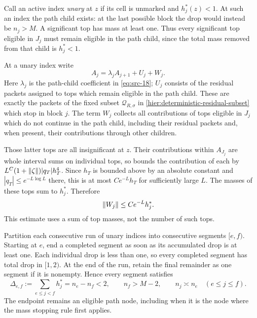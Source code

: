 Call an active index \emph{unary} at $z$ if its cell is unmarked and
$h_j^*(z)<1$.  At such an index the path child exists: at the last
possible block the drop would instead be $n_j>M$.  A significant top
has mass at least one.  Thus every significant top eligible in $J_j$
must remain eligible in the path child, since the total mass removed
from that child is $h_j^*<1$.

At a unary index write
\begin{equation}
  A_j=\lambda_j A_{j+1}+U_j+W_j.
  \label{res:unary-decomposition}
\end{equation}
Here $\lambda_j$ is the path-child coefficient in
\eqref{eq:src-18}; $U_j$ consists of the residual packets assigned
to tops which remain eligible in the path child.  These are exactly
the packets of the fixed subset $\mathcal Q_{R,\sigma}$ in
\eqref{hier:deterministic-residual-subset} which stop in block $j$.  The term $W_j$
collects all contributions of tops eligible in $J_j$ which do not
continue in the path child, including their residual packets and,
when present, their contributions through other children.

Those latter tops are all insignificant at $z$.  Their contributions
within $A_{J_j}$ are whole interval sums on individual tops, so
 bounds the contribution of each by
$L^C(1+\left\|\zeta\right\|)|q_T|h_T^4$.  Since $h_T$ is bounded above by
an absolute constant and $|q_T|\le e^{-L\log L}$ there, this is at
most $Ce^{-L}h_T$ for sufficiently large $L$.  The masses of these
tops sum to $h_j^*$.  Therefore
\begin{equation}
  \left\|W_j\right\|\le Ce^{-L}h_j^*.
  \label{res:discarded-top-error}
\end{equation}
This estimate uses a sum of top masses, not the number of such tops.

Partition each consecutive run of unary indices into consecutive
segments $[e,f)$.  Starting at $e$, end a completed segment as soon
as its accumulated drop is at least one.  Each individual drop is
less than one, so every completed segment has total drop in $[1,2)$.
At the end of the run, retain the final remainder as one segment if
it is nonempty.  Hence every segment satisfies
\begin{equation}
  \Delta_{e,f}:=\sum_{e\le j<f}h_j^*=n_e-n_f<2,
  \qquad n_f>M-2,
  \qquad n_j\asymp n_e\quad(e\le j\le f).
  \label{res:segment-masses}
\end{equation}
The endpoint remains an eligible path node, including when it is the
node where the mass stopping rule first applies.

